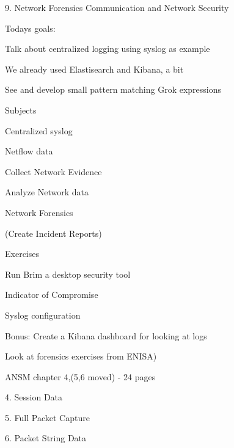 \documentclass[Screen16to9,17pt]{foils}
\begin{document}
\mytitlepage
{9. Network Forensics}
{Communication and Network Security \the\year}




Todays goals:
\begin{list2}
\item Talk about centralized logging using syslog as example
\item We already used Elastisearch and Kibana, a bit
\item See and develop small pattern matching Grok expressions
\end{list2}



\begin{list1}
\item Subjects
\begin{list2}
\item Centralized syslog
\item Netflow data
\item Collect Network Evidence
\item Analyze Network data
\item Network Forensics
\item (Create Incident Reports)
\end{list2}
\item Exercises
\begin{list2}
\item Run Brim a desktop security tool
\item Indicator of Compromise
\item Syslog configuration
\item Bonus: Create a Kibana dashboard for looking at logs
\item Look at forensics exercises from ENISA)

\end{list2}
\end{list1}


\begin{list1}
\item ANSM chapter 4,(5,6 moved) - 24 pages
\item 4. Session Data
\item 5. Full Packet Capture
\item 6. Packet String Data
\end{list1}


\end{document}
